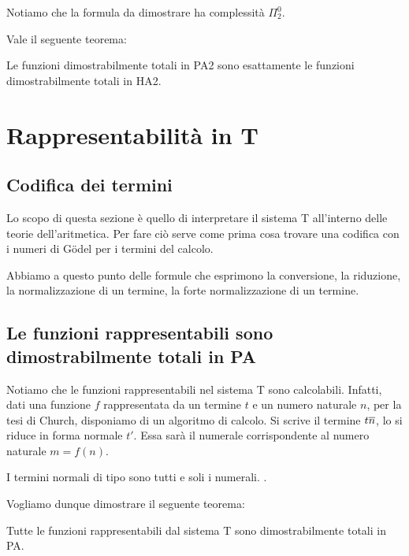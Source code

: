 \documentclass[]{marticle}
\begin{document}
Notiamo che la formula da dimostrare ha complessit\`a $\Pi^0_2$.

Vale il seguente teorema:
\begin{block}[Teorema]
    Le funzioni dimostrabilmente totali in PA2 sono esattamente le funzioni
    dimostrabilmente totali in HA2.
\end{block}

\section{Rappresentabilit\`a in T}
\subsection{Codifica dei termini}
Lo scopo di questa sezione \`e quello di interpretare il sistema T all'interno
delle teorie dell'aritmetica. Per fare ci\`o serve come prima cosa trovare una
codifica con i numeri di G\"odel per i termini del calcolo.
\begin{block}[Definizione]
    
\end{block}

Abbiamo a questo punto delle formule che esprimono la conversione, la riduzione,
la normalizzazione di un termine, la forte normalizzazione di un termine.

\subsection{Le funzioni rappresentabili sono dimostrabilmente totali in PA}

Notiamo che le funzioni rappresentabili nel sistema T sono calcolabili. Infatti,
dati una funzione $f$ rappresentata da un termine $t$ e un numero naturale $n$,
per la tesi di Church, disponiamo di un algoritmo di calcolo. Si scrive il
termine $t\overline{n}$, lo si riduce in forma normale $t'$. Essa sar\`a il
numerale corrispondente al numero naturale $m = f(n)$.

\begin{block}[Lemma]
    I termini normali di tipo  sono tutti e soli i numerali.
    .
\end{block}


Vogliamo dunque dimostrare il seguente teorema:
\begin{block}[Teorema]
    Tutte le funzioni rappresentabili dal sistema T sono dimostrabilmente totali
    in PA.
\end{block}
\end{document}
